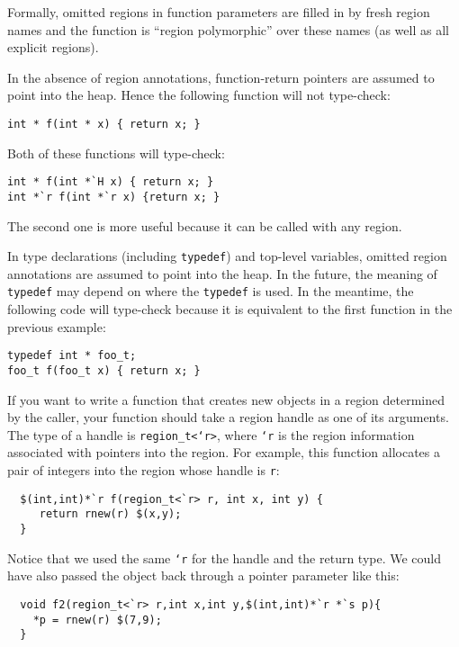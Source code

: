 Formally, omitted regions in function parameters are filled in by
fresh region names and the function is ``region polymorphic'' over
these names (as well as all explicit regions).

In the absence of region annotations, function-return pointers are
assumed to point into the heap.  Hence the following function will not
type-check:
\begin{verbatim}
int * f(int * x) { return x; }
\end{verbatim}
Both of these functions will type-check:
\begin{verbatim}
int * f(int *`H x) { return x; }
int *`r f(int *`r x) {return x; }
\end{verbatim}
The second one is more useful because it can be called with any
region.

In type declarations (including \texttt{typedef}) and top-level variables,
omitted region annotations are assumed to point into the heap.  In the
future, the meaning of \texttt{typedef} may depend on where the
\texttt{typedef} is used.  In the meantime, the following code will
type-check because it is equivalent to the first function in the previous
example:
\begin{verbatim}
typedef int * foo_t;
foo_t f(foo_t x) { return x; }
\end{verbatim}


If you want to write a function that creates new objects in a region
determined by the caller, your function should take a region handle as
one of its arguments.
The type of a handle is \texttt{region\_t<`r>}, where \texttt{`r} is
the region information associated with pointers into the region.  For
example, this function allocates a pair of integers into the region
whose handle is \texttt{r}:
\begin{verbatim}
  $(int,int)*`r f(region_t<`r> r, int x, int y) { 
     return rnew(r) $(x,y);
  }
\end{verbatim}
Notice that we used the same \texttt{`r} for the handle and the return
type.  We could have also passed the object back through a pointer
parameter like this:
\begin{verbatim}
  void f2(region_t<`r> r,int x,int y,$(int,int)*`r *`s p){ 
    *p = rnew(r) $(7,9); 
  }
\end{verbatim}

